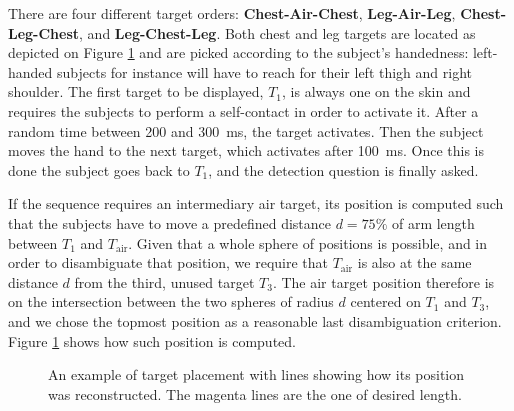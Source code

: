 There are four different target orders: \textbf{Chest-Air-Chest}, \textbf{Leg-Air-Leg}, \textbf{Chest-Leg-Chest}, and \textbf{Leg-Chest-Leg}. Both chest and leg targets are located as depicted on Figure \ref{fig:targetPlacement} and are picked according to the subject's handedness: left-handed subjects for instance will have to reach for their left thigh and right shoulder. The first target to be displayed, $T_1$, is always one on the skin and requires the subjects to perform a self-contact in order to activate it. After a random time between \num{200} and \SI{300}{\milli\second}, the target activates. Then the subject moves the hand to the next target, which activates after \SI{100}{\milli\second}. Once this is done the subject goes back to $T_1$, and the detection question is finally asked.

If the sequence requires an intermediary air target, its position is computed such that the subjects have to move a predefined distance $d = 75\%$ of arm length between $T_1$ and $T_{\text{air}}$. Given that a whole sphere of positions is possible, and in order to disambiguate that position, we require that $T_\text{air}$ is also at the same distance $d$ from the third, unused target $T_3$. The air target position therefore is on the intersection between the two spheres of radius $d$ centered on $T_1$ and $T_3$, and we chose the topmost position as a reasonable last disambiguation criterion. Figure \ref{fig:targetPlacement} shows how such position is computed.

\begin{figure}[h]
    \caption{An example of target placement with lines showing how its position was reconstructed. The magenta lines are the one of desired length.}\label{fig:targetPlacement}
\end{figure}



